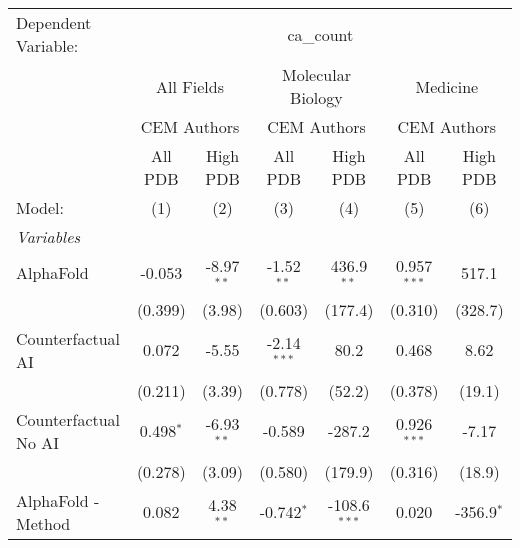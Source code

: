 \begingroup
\centering
\begin{tabular}{lcccccc}
   \tabularnewline \midrule \midrule
   Dependent Variable: & \multicolumn{6}{c}{ca\_count}\\
 & \multicolumn{2}{c}{All Fields} & \multicolumn{2}{c}{Molecular Biology} & \multicolumn{2}{c}{Medicine} \\
\cmidrule(lr){2-3} \cmidrule(lr){4-5} \cmidrule(lr){6-7}
 & \multicolumn{2}{c}{CEM Authors} & \multicolumn{2}{c}{CEM Authors} & \multicolumn{2}{c}{CEM Authors} \\
\cmidrule(lr){2-3} \cmidrule(lr){4-5} \cmidrule(lr){6-7}
 & \multicolumn{1}{c}{All PDB} & \multicolumn{1}{c}{High PDB} & \multicolumn{1}{c}{All PDB} & \multicolumn{1}{c}{High PDB} & \multicolumn{1}{c}{All PDB} & \multicolumn{1}{c}{High PDB} \\
\cmidrule(lr){2-2} \cmidrule(lr){3-3} \cmidrule(lr){4-4} \cmidrule(lr){5-5} \cmidrule(lr){6-6} \cmidrule(lr){7-7}
   Model:                                                     & (1)         & (2)           & (3)           & (4)            & (5)           & (6)\\  
   \midrule
   \emph{Variables}\\
   AlphaFold                                                  & -0.053      & -8.97$^{**}$  & -1.52$^{**}$  & 436.9$^{**}$   & 0.957$^{***}$ & 517.1\\   
                                                              & (0.399)     & (3.98)        & (0.603)       & (177.4)        & (0.310)       & (328.7)\\   
   Counterfactual AI                                          & 0.072       & -5.55         & -2.14$^{***}$ & 80.2           & 0.468         & 8.62\\   
                                                              & (0.211)     & (3.39)        & (0.778)       & (52.2)         & (0.378)       & (19.1)\\   
   Counterfactual No AI                                       & 0.498$^{*}$ & -6.93$^{**}$  & -0.589        & -287.2         & 0.926$^{***}$ & -7.17\\   
                                                              & (0.278)     & (3.09)        & (0.580)       & (179.9)        & (0.316)       & (18.9)\\   
   AlphaFold - Method                                         & 0.082       & 4.38$^{**}$   & -0.742$^{*}$  & -108.6$^{***}$ & 0.020         & -356.9$^{*}$\\   

\end{tabular}
